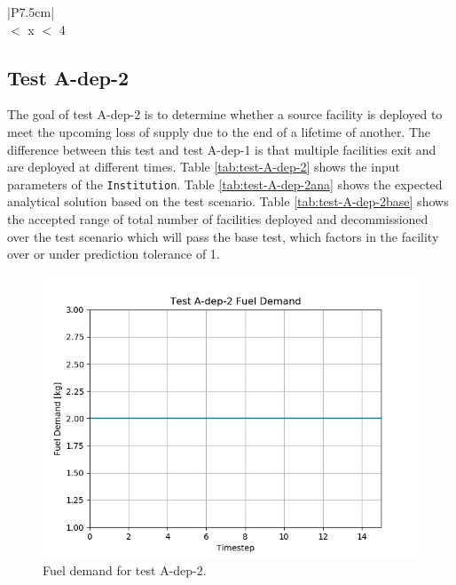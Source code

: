 \documentclass[11pt,letterpaper]{article}
\begin{document}
\begin{table}[H]
	\centering
	\caption{Test A-dep-1 Base Test Acceptance}
	\label{tab:test-A-dep-1base}
	\begin{tabular}{|P{7.5cm}|}
		\hline
		\textbf{}\\
		 $<$ x $<$ 4 \\
		\hline
	\end{tabular}
\end{table}

\subsection{Test A-dep-2}
The goal of test A-dep-2 is to determine whether a source facility is deployed
to meet the upcoming loss of supply due to the end of a lifetime of another.
The difference between this test and test A-dep-1 is that multiple facilities
exit and are deployed at different times.
Table \ref{tab:test-A-dep-2} shows the input parameters of the \texttt{Institution}. Table \ref{tab:test-A-dep-2ana} shows the expected analytical solution based on the test scenario. Table \ref{tab:test-A-dep-2base} shows the accepted range of total number of facilities deployed and decommissioned over the test scenario which will pass the base test, which factors in the facility over or under prediction tolerance of 1.

\begin{figure}[H]
	\begin{center}
		\includegraphics[scale=0.7]{./images/A-dep-2.png}
	\end{center}
        \caption{Fuel demand for test A-dep-2.}
	\label{fig:A-dep-2}
\end{figure}
\end{document}
